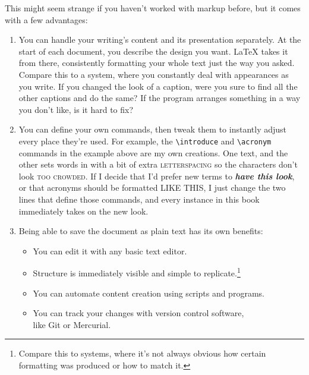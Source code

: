 This might seem strange if you haven't worked with markup before,
but it comes with a few advantages:
\begin{enumerate}
\item You can handle your writing's content and its presentation separately.
    At the start of each document,
    you describe the design you want.
    \LaTeX{} takes it from there, consistently formatting your whole text
    just the way you asked.
    Compare this to a  system,
    where you constantly deal with appearances
    as you write.
    If you changed the look of a caption,
    were you sure to find all the other captions and do the
    same?
    If the program arranges something in a way you don't like,
    is it hard to fix?%

\item You can define your own commands, then tweak them to instantly adjust
    every place they're used.
    For example, the \verb|\introduce| and \verb|\acronym| commands
    in the example above are my own creations.
    One  text, and the other sets words in
     with a bit of extra
    \mbox{\textsc{letterspacing}} so the characters
    don't look \textsc{too crowded}.
    If I decide that I'd prefer new terms to
    \textbf{\itshape have this look}, or that acronyms should be formatted
    {\small{} LIKE THIS},
    I just change the two lines that define those commands,
    and every instance in this book immediately takes on the new look.

\item Being able to save the document as plain text has its own benefits:
    \begin{itemize}
    \item You can edit it with any basic text editor.
    \item Structure is immediately visible
        and simple to replicate.\punckern\footnote{Compare this to
         systems, where it's not always obvious
        how certain formatting was produced or how to match it.}
    \item You can automate content creation using scripts and programs.
    \item You can track your changes with version control software, \\
        like Git or Mercurial.
    \end{itemize}
\end{enumerate}

